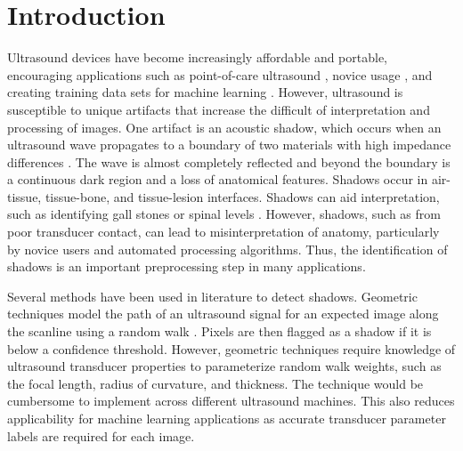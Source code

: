 \documentclass[preprint,5p,authoryear]{elsarticle}
\begin{document}




\section*{Introduction}
\label{intro}
Ultrasound devices have become increasingly affordable and portable, encouraging applications such as point-of-care ultrasound \citep{Bouhemad2011}, novice usage \citep{Becker2016}, and creating training data sets for machine learning \citep{Ghose2013}. However, ultrasound is susceptible to unique artifacts that increase the difficult of interpretation and processing of images. One artifact is an acoustic shadow, which occurs when an ultrasound wave propagates to a boundary of two materials with high impedance differences \citep{Kremkau1986}. The wave is almost completely reflected and beyond the boundary is a continuous dark region and a loss of anatomical features. Shadows occur in air-tissue, tissue-bone, and tissue-lesion interfaces. Shadows can aid interpretation, such as identifying gall stones \citep{Good1979} or spinal levels \citep{Galiano2005}. However, shadows, such as from poor transducer contact, can lead to misinterpretation of anatomy, particularly by novice users and automated processing algorithms. Thus, the identification of shadows is an important preprocessing step in many applications.

Several methods have been used in literature to detect shadows. Geometric techniques model the path of an ultrasound signal for an expected image along the scanline using a random walk \citep{Karamalis2012}. Pixels are then flagged as a shadow if it is below a confidence threshold. However, geometric techniques require knowledge of ultrasound transducer properties to parameterize random walk weights, such as the focal length, radius of curvature, and thickness. The technique would be cumbersome to implement across different ultrasound machines. This also reduces applicability for machine learning applications as accurate transducer parameter labels are required for each image.
\end{document}
